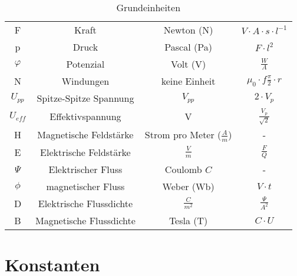 \begin{table}[!htb]
\begin{tabular}{|c|c|c|c|}
        F               & Kraft                     & Newton (N)       & $V \cdot A \cdot s \cdot l^{-1}$ \\ 
        p               & Druck                     & Pascal (Pa)      & $F \cdot l^2$         \\
        $\varphi$       & Potenzial                 & Volt (V)         & $\frac{W}{A}$ \\
        N               & Windungen                 & keine Einheit    & $\mu_0 \cdot f\frac{\pi}{2} \cdot r$ \\
        $U_{pp}$        & Spitze-Spitze Spannung    & $V_{pp}$         & $2 \cdot V_{p}$ \\
        $U_{eff}$       & Effektivspannung          & V                & $\frac{V_p}{\sqrt{2}}$ \\
        \hline


        
        H               & Magnetische Feldstärke    & Strom pro Meter ($\frac{A}{m}$)  & -     \\ 
        E               & Elektrische Feldstärke    & $\frac{V}{m}$    & $\frac{F}{Q}$         \\
        $\Psi$          & Elektrischer Fluss        & Coulomb $C$              & -             \\
        $\phi$          & magnetischer Fluss        & Weber (Wb)      & $V \cdot t$            \\
        D               & Elektrische Flussdichte   & $\frac{C}{m^2}$  & $\frac{\Psi}{A^2}$    \\
        B               & Magnetische Flussdichte   & Tesla (T)        & $C \cdot U$           \\
        \hline
    \end{tabular}
    \caption{Grundeinheiten}
    \label{Grundkonzepte/Einheiten/Tabelle}
\end{table}

\newpage

\section{Konstanten}

